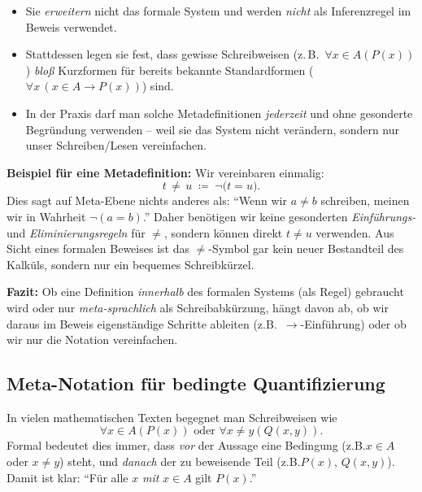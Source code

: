 \documentclass[main.tex]{subfiles}
\begin{document}
\begin{itemize}
\item Sie \emph{erweitern} nicht das formale System und werden \emph{nicht} als Inferenzregel im Beweis verwendet.
\item Stattdessen legen sie fest, dass gewisse Schreibweisen (z.\,B.\ \(\forall x \in A(P(x))\)) \emph{bloß} Kurzformen für bereits bekannte Standardformen (\(\forall x\,(x\in A \to P(x))\)) sind.
\item In der Praxis darf man solche Metadefinitionen \emph{jederzeit} und ohne gesonderte Begründung verwenden – weil sie das System nicht verändern, sondern nur unser Schreiben/Lesen vereinfachen.
\end{itemize}

\bigskip

\noindent
\textbf{Beispiel für eine Metadefinition:}  
Wir vereinbaren einmalig:
\[
t \,\neq\, u
\;\coloneqq\;
\neg\bigl(t = u\bigr).
\]
Dies sagt auf Meta-Ebene nichts anderes als: 
\enquote{Wenn wir \(a\neq b\) schreiben, meinen wir in Wahrheit \(\neg (a = b)\).}  
Daher benötigen wir keine gesonderten \emph{Einführungs-} und \emph{Eliminierungsregeln} für \(\neq\), sondern können direkt
\(t \neq u\) verwenden.  
Aus Sicht eines formalen Beweises ist das \(\neq\)-Symbol gar kein neuer Bestandteil des Kalküls, sondern nur ein bequemes Schreibkürzel.

\bigskip

\begin{remark}
\textbf{Fazit:} Ob eine Definition \emph{innerhalb} des formalen Systems (als Regel) gebraucht wird oder nur \emph{meta-sprachlich} als Schreibabkürzung, hängt davon ab, ob wir daraus im Beweis eigenständige Schritte ableiten (z.B.\ \(\to\)-Einführung) oder ob wir nur die Notation vereinfachen. 
\end{remark}

\subsection{Meta-Notation für bedingte Quantifizierung}
In vielen mathematischen Texten begegnet man Schreibweisen wie
\[
\forall x \in A(P(x))\text{ oder }\forall x \neq y(Q(x,y)).
\]
Formal bedeutet dies immer, dass \emph{vor} der Aussage eine Bedingung (z.B.\;$x\in A$ oder $x \neq y$) steht, und \emph{danach} der zu beweisende Teil (z.B.\;$P(x)$, $Q(x,y)$). Damit ist klar: ``Für alle $x$ \emph{mit} $x\in A$ gilt $P(x)$.''

\bigskip
\end{document}
